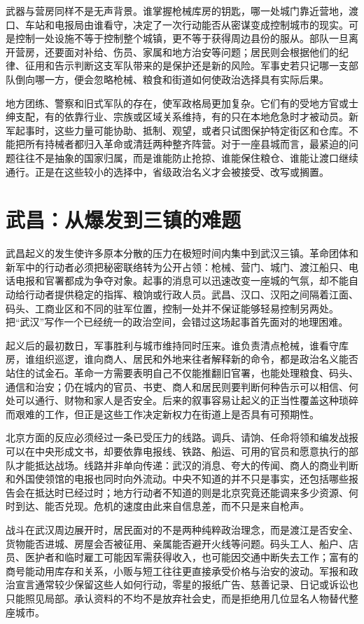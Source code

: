 武器与营房同样不是无声背景。谁掌握枪械库房的钥匙，哪一处城门靠近营地，渡口、车站和电报局由谁看守，决定了一次行动能否从密谋变成控制城市的现实。可是控制一处设施不等于控制整个城镇，更不等于获得周边县份的服从。部队一旦离开营房，还要面对补给、伤员、家属和地方治安等问题；居民则会根据他们的纪律、征用和告示判断这支军队带来的是保护还是新的风险。军事史若只记哪一支部队倒向哪一方，便会忽略枪械、粮食和街道如何使政治选择具有实际后果。

地方团练、警察和旧式军队的存在，使军政格局更加复杂。它们有的受地方官或士绅支配，有的依靠行业、宗族或区域关系维持，有的只在本地危急时才被动员。新军起事时，这些力量可能协助、抵制、观望，或者只试图保护特定街区和仓库。不能把所有持械者都归入革命或清廷两种整齐阵营。对于一座县城而言，最紧迫的问题往往不是抽象的国家归属，而是谁能防止抢掠、谁能保住粮仓、谁能让渡口继续通行。正是在这些较小的选择中，省级政治名义才会被接受、改写或搁置。

\section{武昌：从爆发到三镇的难题}

武昌起义的发生使许多原本分散的压力在极短时间内集中到武汉三镇。革命团体和新军中的行动者必须把秘密联络转为公开占领：枪械、营门、城门、渡江船只、电话电报和官署都成为争夺对象。起事的消息可以迅速改变一座城的气氛，却不能自动给行动者提供稳定的指挥、粮饷或行政人员。武昌、汉口、汉阳之间隔着江面、码头、工商业区和不同的驻军位置，控制一处并不保证能够轻易控制另两处。把“武汉”写作一个已经统一的政治空间，会错过这场起事首先面对的地理困难。

起义后的最初数日，军事胜利与城市维持同时压来。谁负责清点枪械，谁看守库房，谁组织巡逻，谁向商人、居民和外地来往者解释新的命令，都是政治名义能否站住的试金石。革命一方需要表明自己不仅能推翻旧官署，也能处理粮食、码头、通信和治安；仍在城内的官员、书吏、商人和居民则要判断何种告示可以相信、何处可以通行、财物和家人是否安全。后来的叙事容易让起义的正当性覆盖这种琐碎而艰难的工作，但正是这些工作决定新权力在街道上是否具有可预期性。

北京方面的反应必须经过一条已受压力的线路。调兵、请饷、任命将领和编发战报可以在中央形成文书，却要依靠电报线、铁路、船运、可用的官员和愿意执行的部队才能抵达战场。线路并非单向传递：武汉的消息、夸大的传闻、商人的商业判断和外国使领馆的电报也同时向外流动。中央不知道的并不只是事实，还包括哪些报告会在抵达时已经过时；地方行动者不知道的则是北京究竟还能调来多少资源、何时到达、能否兑现。危机的速度由此来自信息差，而不只是来自枪声。

战斗在武汉周边展开时，居民面对的不是两种纯粹政治理念，而是渡江是否安全、货物能否进城、房屋会否被征用、亲属能否避开火线等问题。码头工人、船户、店员、医护者和临时雇工可能因军需获得收入，也可能因交通中断失去工作；富有的商号能动用库存和关系，小贩与短工往往更直接承受价格与治安的波动。军报和政治宣言通常较少保留这些人如何行动，零星的报纸广告、慈善记录、日记或诉讼也只能照见局部。承认资料的不均不是放弃社会史，而是拒绝用几位显名人物替代整座城市。


